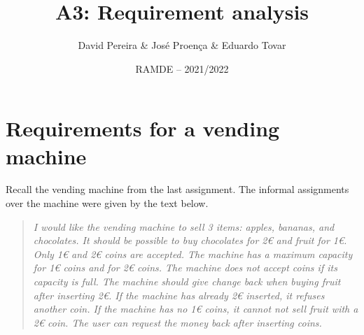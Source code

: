 \documentclass[11pt]{article}
\date{RAMDE -- 2021/2022}
\begin{document}
 
 
\title{A3: Requirement analysis}

\author{David Pereira \& Jos\'{e} Proen\c{c}a \& Eduardo Tovar} 


\maketitle







\section*{Requirements for a vending machine}


\begin{myExercise} \label{ex:vm}
Recall the vending machine from the last assignment.
The informal assignments over the machine were given by the text below.

\begin{quote}\it
  I would like the vending machine to sell 3 items: apples, bananas, and chocolates.
  It should be possible to buy chocolates for 2€ and fruit for 1€.
  Only 1€ and 2€ coins are accepted.
  The machine has a maximum capacity for 1€ coins and for 2€ coins. 
  The machine does not accept coins if its capacity is full.
  The machine should give change back when buying fruit after inserting 2€.
  If the machine has already 2€ inserted, it refuses another coin.
  If the machine has no 1€ coins, it cannot not sell fruit with a 2€ coin. 
  The user can request the money back after inserting coins.
\end{quote}




\end{myExercise}
\end{document}
